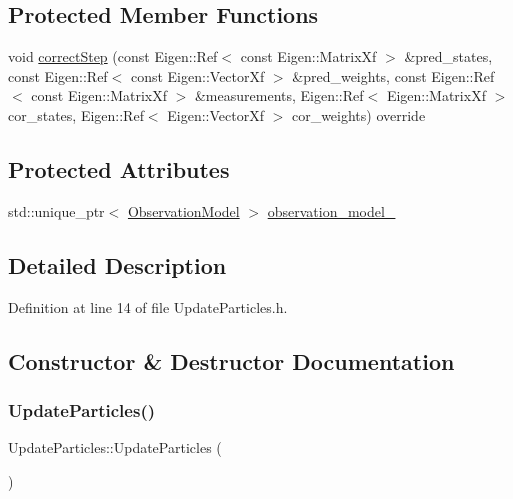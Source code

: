 \subsection*{Protected Member Functions}
\begin{DoxyCompactItemize}
\item 
void \mbox{\hyperlink{classbfl_1_1UpdateParticles_aa589f7fab7cd83f310c9dc17ee169dec}{correct\+Step}} (const Eigen\+::\+Ref$<$ const Eigen\+::\+Matrix\+Xf $>$ \&pred\+\_\+states, const Eigen\+::\+Ref$<$ const Eigen\+::\+Vector\+Xf $>$ \&pred\+\_\+weights, const Eigen\+::\+Ref$<$ const Eigen\+::\+Matrix\+Xf $>$ \&measurements, Eigen\+::\+Ref$<$ Eigen\+::\+Matrix\+Xf $>$ cor\+\_\+states, Eigen\+::\+Ref$<$ Eigen\+::\+Vector\+Xf $>$ cor\+\_\+weights) override
\end{DoxyCompactItemize}
\subsection*{Protected Attributes}
\begin{DoxyCompactItemize}
\item 
std\+::unique\+\_\+ptr$<$ \mbox{\hyperlink{classbfl_1_1ObservationModel}{Observation\+Model}} $>$ \mbox{\hyperlink{classbfl_1_1UpdateParticles_a6414b89b3c7bf79d04c996512d63ae6c}{observation\+\_\+model\+\_\+}}
\end{DoxyCompactItemize}


\subsection{Detailed Description}


Definition at line 14 of file Update\+Particles.\+h.



\subsection{Constructor \& Destructor Documentation}
\mbox{\label{classbfl_1_1UpdateParticles_a7fdb4642d8a970b29f9fe70b6ece7152}} 
\subsubsection{\texorpdfstring{Update\+Particles()}{UpdateParticles()}\hspace{0.1cm}{\footnotesize\ttfamily [1/2]}}
{\footnotesize\ttfamily Update\+Particles\+::\+Update\+Particles (\begin{DoxyParamCaption}{ }\end{DoxyParamCaption})\hspace{0.3cm}{\ttfamily [noexcept]}}



